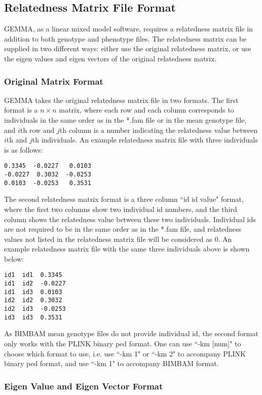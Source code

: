 \documentclass[11pt]{article}
\begin{document}
\subsection{Relatedness Matrix File Format}

GEMMA, as a linear mixed model software, requires a relatedness matrix
file in addition to both genotype and phenotype files. The relatedness
matrix can be supplied in two different ways: either use the original
relatedness matrix, or use the eigen values and eigen vectors of the
original relatedness matrix.

\subsubsection{Original Matrix Format}

GEMMA takes the original relatedness matrix file in two formats. The
first format is a $n\times n$ matrix, where each row and each column
corresponds to individuals in the same order as in the *.fam file or
in the mean genotype file, and $i$th row and $j$th column is a number
indicating the relatedness value between $i$th and $j$th
individuals. An example relatedness matrix file with three individuals
is as follows:
%
\begin{verbatim}
0.3345  -0.0227   0.0103
-0.0227  0.3032  -0.0253
0.0103  -0.0253   0.3531
\end{verbatim}
%
The second relatedness matrix format is a three column ``id id value"
format, where the first two columns show two individual id numbers,
and the third column shows the relatedness value between these two
individuals. Individual ids are not required to be in the same order
as in the *.fam file, and relatedness values not listed in the
relatedness matrix file will be considered as 0. An example
relatedness matrix file with the same three individuals above is shown
below:
%
\begin{verbatim}
id1  id1  0.3345
id1  id2  -0.0227
id1  id3  0.0103
id2  id2  0.3032
id2  id3  -0.0253
id3  id3  0.3531
\end{verbatim}
%
As BIMBAM mean genotype files do not provide individual id, the second
format only works with the PLINK binary ped format. One can use ``-km
[num]" to choose which format to use, i.e. use ``-km 1" or ``-km 2" to
accompany PLINK binary ped format, and use ``-km 1" to accompany
BIMBAM format.

\subsubsection{Eigen Value and Eigen Vector Format}
\end{document}

